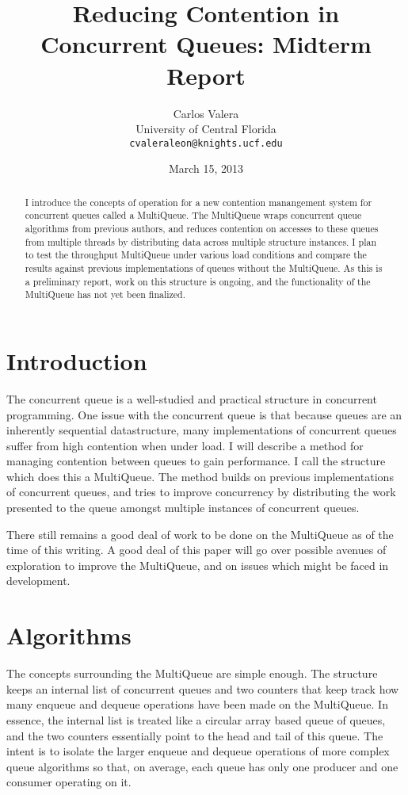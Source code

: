 \documentclass[12pt]{report}
\begin{document}
\title{Reducing Contention in Concurrent Queues: Midterm Report}
\author{Carlos Valera \\
    University of Central Florida \\
    \texttt{cvaleraleon@knights.ucf.edu}}
\date{March 15, 2013}
\maketitle
\begin{abstract}
I introduce the concepts of operation for a new contention manangement system
for concurrent queues called a MultiQueue. The MultiQueue wraps concurrent
queue algorithms from previous authors, and reduces contention on accesses to
these queues from multiple threads by distributing data across multiple
structure instances. I plan to test the throughput MultiQueue under various
load conditions and compare the results against previous implementations of
queues without the MultiQueue.  As this is a preliminary report, work on this
structure is ongoing, and the functionality of the MultiQueue has not yet been
finalized.
\end{abstract}
\section{Introduction}
The concurrent queue is a well-studied and practical structure in concurrent
programming. One issue with the concurrent queue is that because queues are an
inherently sequential datastructure, many implementations of concurrent queues
suffer from high contention when under load. I will describe a method for
managing contention between queues to gain performance. I call the structure
which does this a MultiQueue. The method builds on previous implementations of
concurrent queues, and tries to improve concurrency by distributing the work
presented to the queue amongst multiple instances of concurrent queues.

There still remains a good deal of work to be done on the MultiQueue as of the
time of this writing. A good deal of this paper will go over possible avenues
of exploration to improve the MultiQueue, and on issues which might be faced in
development.

\section{Algorithms}
The concepts surrounding the MultiQueue are simple enough. The structure keeps
an internal list of concurrent queues and two counters that keep track how many
enqueue and dequeue operations have been made on the MultiQueue. In essence,
the internal list is treated like a circular array based queue of queues, and
the two counters essentially point to the head and tail of this queue. The
intent is to isolate the larger enqueue and dequeue operations of more complex
queue algorithms so that, on average, each queue has only one producer and one
consumer operating on it.
\end{document}
